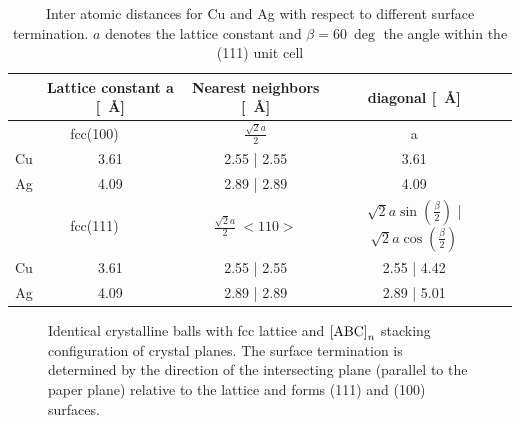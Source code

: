 \begin{table}
\centering {}
\caption{Inter atomic distances for Cu and Ag with respect to different surface termination. $a$ denotes the lattice constant and $\beta= \SI{60}{\deg}$ the angle within the (111) unit cell}
\label{tab:lattice-constants}
  \begin{tabular}{ccccc}
& Lattice constant a [\SI{}{\angstrom}] & Nearest neighbors [\SI{}{\angstrom}] & diagonal [\SI{}{\angstrom}]\\ \hline 
\multicolumn{2}{c}{fcc(100)} & $\frac{\sqrt{2}a}{2}$ & a \\
  Cu	 	& 3.61	& 2.55 | 2.55 & 3.61  \\
  Ag		& 4.09	& 2.89 | 2.89 & 4.09 \\ \hline 
\multicolumn{2}{c}{fcc(111)} & $\frac{\sqrt{2}a}{2} \ <110>$ & $\sqrt{2}a\sin(\frac{\beta}{2})$ | $\sqrt{2}a\cos(\frac{\beta}{2})$\\
Cu 		& 3.61	& 2.55 | 2.55	& 2.55 | 4.42 \\
Ag		& 4.09	& 2.89 | 2.89	& 2.89 | 5.01 \\ \hline
 \end{tabular}
\end{table}

\begin{figure}\centering
	 \quad
	\caption{Identical crystalline balls with fcc lattice and $\textnormal{[ABC]}_n$ stacking configuration of crystal planes. The surface termination is determined by the direction of the intersecting plane (parallel to the paper plane) relative to the lattice and forms (111) and (100) surfaces.}
	\label{fig:crystal-termination}
\end{figure}

